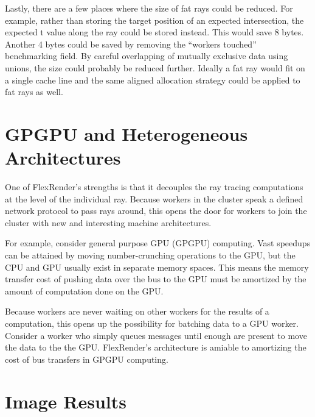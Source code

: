 \documentclass[12pt]{ucthesis}
\begin{document}
Lastly, there are a few places where the size of fat rays could be reduced.
For example, rather than storing the target position of an expected
intersection, the expected t value along the ray could be stored instead. This
would save 8 bytes. Another 4 bytes could be saved by removing the ``workers
touched'' benchmarking field. By careful overlapping of mutually exclusive data
using unions, the size could probably be reduced further. Ideally a fat ray
would fit on a single cache line and the same aligned allocation strategy could
be applied to fat rays as well.

\section{GPGPU and Heterogeneous Architectures}
\label{hetergenous}

One of FlexRender's strengths is that it decouples the ray tracing computations
at the level of the individual ray. Because workers in the cluster speak a
defined network protocol to pass rays around, this opens the door for workers to
join the cluster with new and interesting machine architectures.

For example, consider general purpose GPU (GPGPU) computing. Vast speedups can
be attained by moving number-crunching operations to the GPU, but the CPU and
GPU usually exist in separate memory spaces. This means the memory transfer cost
of pushing data over the bus to the GPU must be amortized by the amount of
computation done on the GPU.

Because workers are never waiting on other workers for the results of a
computation, this opens up the possibility for batching data to a GPU worker.
Consider a worker who simply queues messages until enough are present to move
the data to the the GPU. FlexRender's architecture is amiable to amortizing
the cost of bus transfers in GPGPU computing.

\clearpage



\section*{Image Results}
\end{document}
